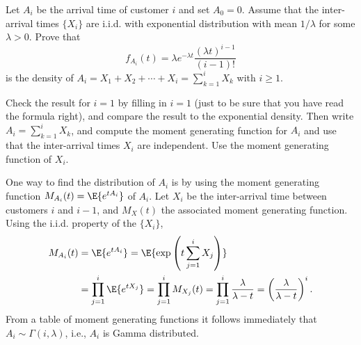   \begin{exercise}
 Let $A_i$ be the arrival time of customer $i$ and set $A_0=0$.
    Assume that the inter-arrival times $\{X_i\}$ are i.i.d.  with
    exponential distribution with mean $1/\lambda$ for some
    $\lambda>0$.  Prove that
\begin{equation*}
f_{A_i}(t) = \lambda e^{-\lambda t} \frac{(\lambda t)^{i-1}}{(i-1)!}
\end{equation*}
is  the density of $A_i=X_1+X_2+\cdots+X_i=\sum_{k=1}^i X_k$ with $i\geq 1$. 
\begin{hint}
 Check the result for $i=1$ by filling in $i=1$ (just to be
     sure that you have read the formula right), and compare the result
     to the exponential density. Then write $A_i =\sum_{k=1}^i X_k$, and compute the moment
     generating function for $A_i$ and use that the inter-arrival times
     $X_i$ are independent. Use the moment generating function  of $X_i$.
\end{hint}
\begin{solution}
 One way to find the distribution of $A_i$ is by using the
    moment generating function $M_{A_i}(t) = \E{e^{t A_i}}$ of
    $A_i$. Let $X_i$ be the inter-arrival time between customers $i$
    and $i-1$, and $M_X(t)$ the associated moment generating
    function. Using the i.i.d. property of the $\{X_i\}$,
\begin{align*}
  M_{A_i}(t) &= \E{e^{t A_i}} = \E{\exp\left(t\sum_{j=1}^{i} X_j\right)} \\
& = \prod_{j=1}^{i} \E{e^{tX_j}} = 
\prod_{j=1}^{i} M_{X_j}(t) = 
\prod_{j=1}^{i} \frac{\lambda}{\lambda -t }
 = \left(\frac{\lambda}{\lambda -t }\right)^i.
\end{align*}
From a table of moment generating functions it follows immediately that
$A_i \sim \Gamma(i,\lambda)$, i.e., $A_i$ is Gamma distributed.
\end{solution}
\end{exercise}


